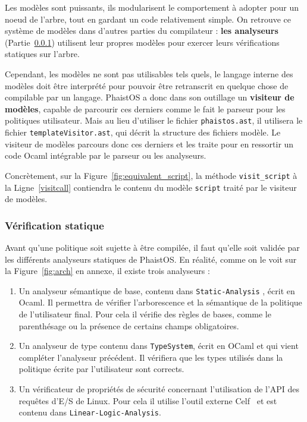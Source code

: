 Les modèles sont puissants, ils modularisent le comportement à adopter pour un 
noeud de l'arbre, tout en gardant un code relativement simple. On retrouve ce 
système de modèles dans d'autres parties du compilateur : \textbf{les 
analyseurs} (Partie~\ref{analyzers}) utilisent leur propres modèles pour 
exercer leurs vérifications statiques sur l'arbre.

Cependant, les modèles ne sont pas utilisables tels quels, le langage interne 
des modèles doit être interprété pour pouvoir être retranscrit en quelque chose 
de compilable par un langage. PhaistOS a donc dans son outillage un \textbf
{visiteur de modèles}, capable de parcourir ces derniers comme le fait le 
parseur pour les politiques utilisateur. Mais au lieu d'utiliser le fichier 
\texttt{phaistos.ast}, il utilisera le fichier \texttt{templateVisitor.ast}, 
qui décrit la structure des fichiers modèle. Le visiteur de modèles parcours 
donc ces derniers et les traite pour en ressortir un code Ocaml intégrable par 
le parseur ou les analyseurs. 

Concrètement, sur la Figure~\ref{fig:equivalent_script}, la méthode \texttt
{visit\_script} à la Ligne~\ref{visitcall} contiendra le contenu du modèle 
\texttt{script} traité par le visiteur de modèles.

\subsubsection{Vérification statique}
\label{analyzers}

Avant qu'une politique soit sujette à être compilée, il faut qu'elle soit 
validée par les différents analyseurs statiques de PhaistOS. En réalité, comme 
on le voit sur la Figure~\ref{fig:arch} en annexe, il existe trois analyseurs : 

\begin{enumerate}
    \item Un analyseur sémantique de base, contenu dans \texttt{Static-Analysis}
    , écrit en Ocaml. Il permettra de vérifier l'arborescence et la sémantique 
    de la politique de l'utilisateur final. Pour cela il vérifie des règles de 
    bases, comme le parenthésage ou la présence de certains champs obligatoires.
    \item Un analyseur de type contenu dans \texttt{TypeSystem}, écrit en OCaml 
    et qui vient compléter l'analyseur précédent. Il vérifiera que les types 
    utilisés dans la politique écrite par l'utilisateur sont corrects.
    \item Un vérificateur de propriétés de sécurité concernant l'utilisation de 
    l'API des requêtes d'E/S de Linux. Pour cela il utilise l'outil externe 
    Celf~\cite{schack2008celf} et est contenu dans \texttt
    {Linear-Logic-Analysis}.
\end{enumerate}

